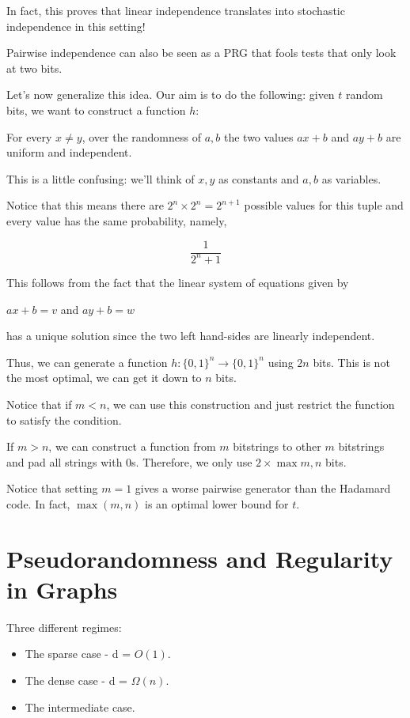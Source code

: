 \documentclass{article}
\theoremstyle{definition}
\newcommand{\bitstring}[1]{\{0,1\}^{#1}}
\begin{document}
In fact, this proves that linear independence translates into stochastic
independence in this setting!

Pairwise independence can also be seen as a PRG that fools tests that only
look at two bits.

Let's now generalize this idea. Our aim is to do the following: given
$t$ random bits, we want to construct a function $h:$

For every $x \neq y$, over the randomness of $a,b$ the two values
$ax + b$ and $ay + b$ are uniform and independent.

This is a little confusing: we'll think of $x,y$ as constants and $a,b$
as variables.

Notice that this means there are $2^{n} \times 2^{n} = 2^{n+1}$ possible
values for this tuple and every value has the same probability, namely,

\[ \frac{1}{2^{n} + 1}\]

This follows from the fact that the linear system of equations given
by 

$ax + b = v$ and $ay + b = w$

has a unique solution since the two left hand-sides are linearly independent.

Thus, we can generate a function $h: \bitstring{n} \xrightarrow{} \bitstring{n}$
using $2n$ bits. This is not the most optimal, we can get it down to $n$ bits.

Notice that if $m < n$, we can use this construction and just restrict the function
to satisfy the condition.

If $m > n$, we can construct a function from $m$ bitstrings to other $m$ bitstrings
and pad all strings with 0s. Therefore, we only use $2 \times \max{m,n}$ bits.

Notice that setting $m = 1$ gives a worse pairwise generator than the Hadamard code.
In fact, $\max(m,n)$ is an optimal lower bound for $t$.

\newpage

\section{Pseudorandomness and Regularity in Graphs}

Three different regimes:

\begin{itemize}
    \item The sparse case - d = $O(1)$.
    \item The dense case - d = $\Omega(n)$.
    \item The intermediate case.
\end{itemize}
\end{document}
